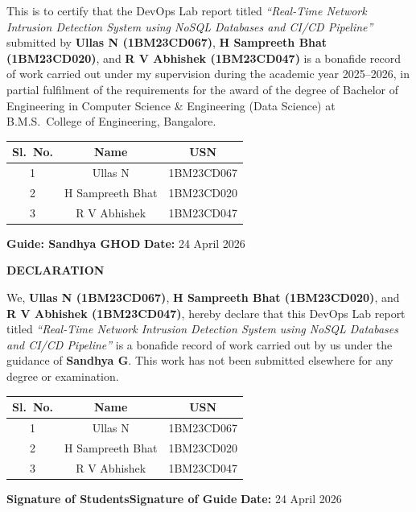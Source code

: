 \documentclass[12pt,a4paper]{report}
\begin{document}
This is to certify that the DevOps Lab report titled
\textit{``Real-Time Network Intrusion Detection System using NoSQL Databases
and CI/CD Pipeline''} submitted by \textbf{Ullas N (1BM23CD067)},
\textbf{H Sampreeth Bhat (1BM23CD020)}, and \textbf{R V Abhishek (1BM23CD047)} is a
bonafide record of work carried out under my supervision during the academic
year 2025--2026, in partial fulfilment of the requirements for the award of
the degree of Bachelor of Engineering in Computer Science \& Engineering
(Data Science) at B.M.S.\ College of Engineering, Bangalore.

\vspace{1cm}
\begin{center}
  \begin{tabular}{ccc}
    \toprule
    \textbf{Sl.\ No.} & \textbf{Name} & \textbf{USN} \\
    \midrule
    1 & Ullas N & 1BM23CD067 \\
    2 & H Sampreeth Bhat & 1BM23CD020 \\
    3 & R V Abhishek & 1BM23CD047 \\
    \bottomrule
  \end{tabular}
\end{center}
\vspace{1.5cm}
\noindent\textbf{Guide: Sandhya G}\hfill\textbf{HOD}
\vfill
\noindent\textbf{Date:} 24 April 2026

\newpage
\thispagestyle{plain}
\begin{center}
  \textbf{\Large DECLARATION}
\end{center}
\vspace{0.5cm}

We, \textbf{Ullas N (1BM23CD067)}, \textbf{H Sampreeth Bhat (1BM23CD020)},
and \textbf{R V Abhishek (1BM23CD047)}, hereby declare that this DevOps Lab
report titled \textit{``Real-Time Network Intrusion Detection System using
NoSQL Databases and CI/CD Pipeline''} is a bonafide record of work carried
out by us under the guidance of \textbf{Sandhya G}.  This work has not been
submitted elsewhere for any degree or examination.

\vspace{1.5cm}
\begin{center}
  \begin{tabular}{ccc}
    \toprule
    \textbf{Sl.\ No.} & \textbf{Name} & \textbf{USN} \\
    \midrule
    1 & Ullas N & 1BM23CD067 \\
    2 & H Sampreeth Bhat & 1BM23CD020 \\
    3 & R V Abhishek & 1BM23CD047 \\
    \bottomrule
  \end{tabular}
\end{center}
\vspace{1.5cm}
\noindent\textbf{Signature of Students}\hfill\textbf{Signature of Guide}
\vfill
\noindent\textbf{Date:} 24 April 2026
\end{document}
